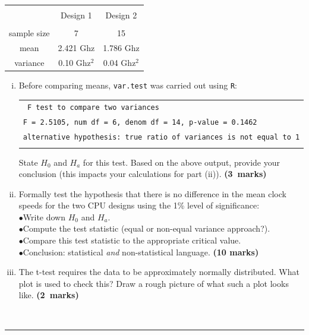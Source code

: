 \documentclass[12pt]{article}
\begin{document}
\begin{enumerate}[a)]
\begin{small}
\begin{center}
\begin{tabular}{|c|c|c|}
\hline
&&\\[-0.3cm]
& Design 1 & Design 2 \\
\hline
&&\\[-0.2cm]
sample size      & 7 & 15 \\[0.2cm]
mean   & 2.421\,\,Ghz  & 1.786\,\,Ghz \\[0.2cm]
variance &  0.10\,\,Ghz$^2$ & 0.04\,\,Ghz$^2$ \\[0.2cm]
\hline
\end{tabular}
\end{center}
\end{small}
\begin{enumerate}[i)]\itemsep0.6cm
    \item Before comparing means, \texttt{var.test} was carried out using \texttt{R}:\\[0.2cm]
\begin{footnotesize}
\begin{tabular}{|l|}
\hline
\texttt{            F test to compare two variances} \\
\texttt{F = 2.5105, num df = 6, denom df = 14, p-value = 0.1462}\\
\texttt{alternative hypothesis: true ratio of variances is not equal to 1}\\
\hline
\multicolumn{1}{c}{}
\end{tabular}
\end{footnotesize}
State $H_0$ and $H_a$ for this test. Based on the above output, provide your conclusion (this impacts your calculations for part (ii)).    \hfill{\mbox{\scriptsize \bf (3 marks)}}
    \item Formally test the hypothesis that there is no difference in the mean clock speeds for the two CPU designs using the 1\% level of \mbox{significance:}\\[0.15cm]
        $\bullet$\quad Write down $H_0$ and $H_a$.\\[0.15cm]
        $\bullet$\quad Compute the test statistic (equal or non-equal variance approach?).\\[0.15cm]
        $\bullet$\quad Compare this test statistic to the appropriate critical value.\\[0.15cm]
        $\bullet$\quad Conclusion: statistical \emph{and} non-statistical language.
     \hfill{\scriptsize \bf (10 marks)}
     \item The t-test requires the data to be approximately normally distributed. What plot is used to check this? Draw a rough picture of what such a plot looks like. \hfill{\mbox{\scriptsize \bf (2 marks)}}
    \end{enumerate}
\end{enumerate}
\quad\\[-0.3cm]
\noindent\rule{\linewidth}{1pt}
\end{document}
